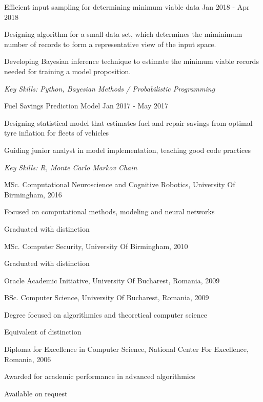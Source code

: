 \documentclass[11pt,article,oneside]{memoir}
\newenvironment{itemize*}{%
  \renewcommand\labelitemi{\textbullet}
  \footnotesize
  \begin{itemize}%
    \setlength{\itemsep}{0pt}}%
  {\end{itemize}
}
\begin{document}
\normalsize
\medskip
\ind Efficient input sampling for determining minimum viable data \hfill Jan 2018 - Apr 2018
\begin{itemize*}
  \item Designing algorithm for a small data set, which determines the miminimum number of records to form a representative view of the input space.
  \item Developing Bayesian inference technique to estimate the minimum viable records needed for training a model proposition.
\end{itemize*}
\ind \hspace{0.35in} \footnotesize \emph{Key Skills: Python, Bayesian Methods / Probabilistic Programming}

\normalsize
\medskip
\ind Fuel Savings Prediction Model \hfill Jan 2017 - May 2017
\begin{itemize*}
  \item Designing statistical model that estimates fuel and repair savings from optimal tyre inflation for fleets of vehicles
  \item Guiding junior analyst in model implementation, teaching good code practices
\end{itemize*}
\ind \hspace{0.35in} \footnotesize \emph{Key Skills: R, Monte Carlo Markov Chain}


\normalsize
\bigskip
{}

\ind MSc. Computational Neuroscience and Cognitive Robotics, University Of Birmingham, \hfill 2016

\ind \hspace{0.35in} \footnotesize Focused on computational methods, modeling and neural networks \normalsize

\ind \hspace{0.35in} \footnotesize Graduated with distinction \normalsize

\ind MSc. Computer Security, University Of Birmingham, \hfill 2010

\ind \hspace{0.35in} \footnotesize Graduated with distinction \normalsize

\ind Oracle Academic Initiative, University Of Bucharest, Romania, \hfill 2009

\ind BSc. Computer Science, University Of Bucharest, Romania, \hfill 2009

\ind \hspace{0.35in} \footnotesize Degree focused on algorithmics and theoretical computer science\normalsize

\ind \hspace{0.35in} \footnotesize Equivalent of distinction \normalsize

\ind Diploma for Excellence in Computer Science, National Center For Excellence, Romania, \hfill 2006

\ind \hspace{0.35in} \footnotesize Awarded for academic performance in advanced algorithmics \normalsize

\normalsize
\bigskip
{}

\ind Available on request
\end{document}
